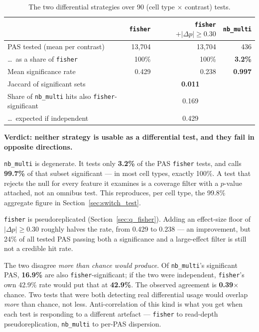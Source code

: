 \begin{table}[htbp]
  \centering
  \small
  \begin{tabular}{lrrr}
    \toprule
    & \texttt{fisher} & \texttt{fisher} $+|\Delta p|\geq0.30$ & \texttt{nb\_multi} \\
    \midrule
    PAS tested (mean per contrast) & 13,704 & 13,704 & 436 \\
    \dots\ as a share of \texttt{fisher} & 100\% & 100\% & \textbf{3.2\%} \\
    Mean significance rate & 0.429 & 0.238 & \textbf{0.997} \\
    \midrule
    Jaccard of significant sets & \multicolumn{3}{c}{\textbf{0.011}} \\
    Share of \texttt{nb\_multi} hits also \texttt{fisher}-significant & \multicolumn{3}{c}{0.169} \\
    \dots\ expected if independent & \multicolumn{3}{c}{0.429} \\
    \bottomrule
  \end{tabular}
  \caption{The two differential strategies over 90 (cell type $\times$ contrast)
    tests.}
  \label{tab:diff_strategies_atlas}
\end{table}

\textbf{Verdict: neither strategy is usable as a differential test, and they
fail in opposite directions.}

\texttt{nb\_multi} is degenerate. It tests only \textbf{3.2\%} of the PAS
\texttt{fisher} tests, and calls \textbf{99.7\%} of that subset significant ---
in most cell types, exactly 100\%. A test that rejects the null for every
feature it examines is a coverage filter with a $p$-value attached, not an
omnibus test. This reproduces, per cell type, the 99.8\% aggregate figure in
Section~\ref{sec:switch_test}.

\texttt{fisher} is pseudoreplicated (Section~\ref{sec:q_fisher}). Adding an
effect-size floor of $|\Delta p| \geq 0.30$ roughly halves the rate, from 0.429
to 0.238 --- an improvement, but 24\% of all tested PAS passing both a
significance and a large-effect filter is still not a credible hit rate.

The two disagree \emph{more than chance would produce}. Of \texttt{nb\_multi}'s
significant PAS, \textbf{16.9\%} are also \texttt{fisher}-significant; if the
two were independent, \texttt{fisher}'s own 42.9\% rate would put that at
\textbf{42.9\%}. The observed agreement is \textbf{0.39$\times$} chance. Two
tests that were both detecting real differential usage would overlap
\emph{more} than chance, not less. Anti-correlation of this kind is what you get
when each test is responding to a different artefact --- \texttt{fisher} to
read-depth pseudoreplication, \texttt{nb\_multi} to per-PAS dispersion.

